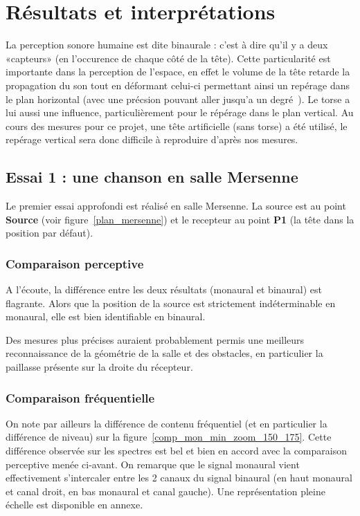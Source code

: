 \chapter{Résultats et interprétations}

La perception sonore humaine est dite binaurale : c'est à dire qu'il y a deux «capteurs» (en l'occurence de chaque côté
de la tête).
Cette particularité est importante dans la perception de l'espace, en effet le volume de la tête retarde la propagation
du son tout en déformant celui-ci permettant ainsi un repérage dans le plan horizontal (avec une précsion pouvant aller
jusqu'a un degré~\cite{Vor08}). Le torse a lui aussi une influence, particulièrement pour le répérage dans le plan
vertical. Au cours des mesures pour ce projet, une tête artificielle (sans torse) a été utilisé, le repérage vertical
sera donc difficile à reproduire d'après nos mesures.

\section{Essai 1 : une chanson en salle Mersenne} %

Le premier essai approfondi est réalisé en salle Mersenne. La source est au point \textbf{Source} (voir
figure~\ref{plan_mersenne}) et le recepteur au point \textbf{P1} (la tête dans la position par défaut).

\subsection{Comparaison perceptive} %

A l'écoute, la différence entre les deux résultats (monaural et binaural) est flagrante. Alors que la position de la
source est strictement indéterminable en monaural, elle est bien identifiable en binaural.

Des mesures plus précises auraient probablement permis une meilleurs reconnaissance de la géométrie de la salle et des
obstacles, en particulier la paillasse présente sur la droite du récepteur.

\subsection{Comparaison fréquentielle} %

On note par ailleurs la différence de contenu fréquentiel (et en particulier la différence de niveau) sur la
figure~\ref{comp_mon_min_zoom_150_175}. Cette différence observée sur les spectres est bel et bien en accord avec la
comparaison perceptive menée ci-avant.
 On remarque que le signal monaural vient effectivement s'intercaler entre les
	2 canaux du signal binaural (en haut monaural et canal droit, en bas monaural et canal gauche). Une représentation
pleine échelle est disponible en annexe.


